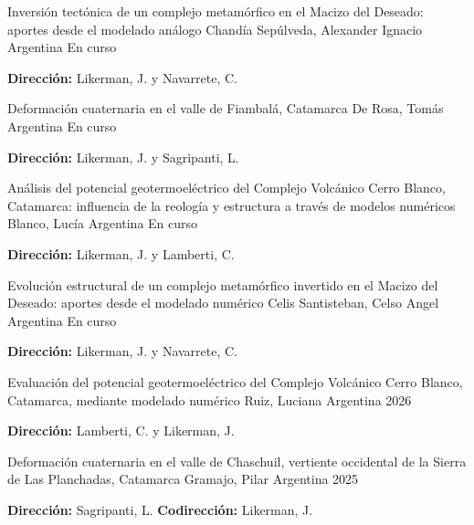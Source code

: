 \begin{cventries}
\cventry
    {Inversión tectónica de un complejo metamórfico en el Macizo del Deseado: aportes desde el modelado análogo}
    {Chandía Sepúlveda, Alexander Ignacio}
    {Argentina}
    {En curso}
    {
      \begin{cvitems}
        \item {\textbf{Dirección:} Likerman, J. y Navarrete, C.}
      \end{cvitems}
    }

\cventry
    {Deformación cuaternaria en el valle de Fiambalá, Catamarca}
    {De Rosa, Tomás}
    {Argentina}
    {En curso}
    {
      \begin{cvitems}
        \item {\textbf{Dirección:} Likerman, J. y Sagripanti, L.}
      \end{cvitems}
    }

\cventry
    {Análisis del potencial geotermoeléctrico del Complejo Volcánico Cerro Blanco, Catamarca: influencia de la reología y estructura a través de modelos numéricos}
    {Blanco, Lucía}
    {Argentina}
    {En curso}
    {
      \begin{cvitems}
        \item {\textbf{Dirección:} Likerman, J. y Lamberti, C.}
      \end{cvitems}
    }

\cventry
    {Evolución estructural de un complejo metamórfico invertido en el Macizo del Deseado: aportes desde el modelado numérico}
    {Celis Santisteban, Celso Angel}
    {Argentina}
    {En curso}
    {
      \begin{cvitems}
        \item {\textbf{Dirección:} Likerman, J. y Navarrete, C.}
      \end{cvitems}
    }

\cventry
    {Evaluación del potencial geotermoeléctrico del Complejo Volcánico Cerro Blanco, Catamarca, mediante modelado numérico}
    {Ruiz, Luciana}
    {Argentina}
    {2026}
    {
      \begin{cvitems}
        \item {\textbf{Dirección:} Lamberti, C. y Likerman, J.}
      \end{cvitems}
    }

\cventry
    {Deformación cuaternaria en el valle de Chaschuil, vertiente occidental de la Sierra de Las Planchadas, Catamarca}
    {Gramajo, Pilar}
    {Argentina}
    {2025}
    {
      \begin{cvitems}
        \item {\textbf{Dirección:} Sagripanti, L. \textbf{Codirección:} Likerman, J.}
      \end{cvitems}
    }


\end{cventries}
